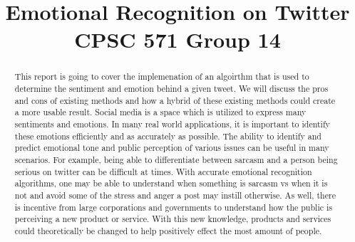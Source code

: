 \documentclass[conference]{IEEEtran}
\begin{document}
\title{Emotional Recognition on Twitter\\
{\footnotesize CPSC 571 Group 14}
}

\author{
\and
{}
\and
{}
}

\maketitle

\begin{abstract}
This report is going to cover the implemenation of an algoirthm that is used to determine the sentiment and emotion behind a given tweet.
We will discuss the pros and cons of existing methods and how a hybrid of these existing methods could create a more usable result.
Social media is a space which is utilized to express many sentiments and emotions. 
In many real world applications, it is important to identify these emotions efficiently and as accurately as possible. 
The ability to identify and predict emotional tone and public perception of various issues can be useful in many scenarios. 
For example, being able to differentiate between sarcasm and a person being serious on twitter can be difficult at times. 
With accurate emotional recognition algorithms, one may be able to understand when something is sarcasm vs when it is not and avoid some of the stress and anger a post may instill otherwise. 
As well, there is incentive from large corporations and governments to understand how the public is perceiving a new product or service. 
With this new knowledge, products and services could theoretically be changed to help positively effect the most amount of people. 

\end{abstract}
\end{document}
